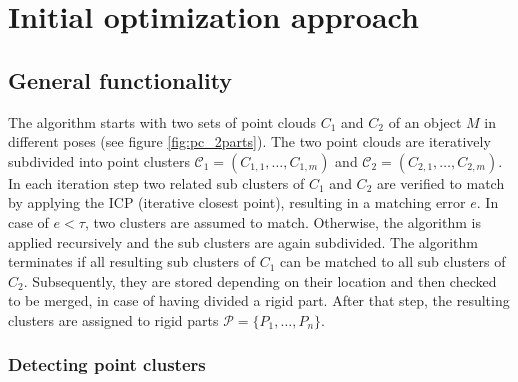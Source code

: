 \chapter{Initial optimization approach}
\label{cha:TheThesis}

\section{General functionality}

The algorithm starts with two sets of point clouds $C_1$ and $C_2$ of an object $M$ in different poses (see figure \ref{fig:pc_2parts}). The two point clouds are iteratively subdivided into point clusters $\mathcal{C}_1 =  (C_{1,1},\ldots, C_{1,m})$ and $\mathcal{C}_2 =  (C_{2,1},\ldots, C_{2,m})$. In each iteration step two related sub clusters of $C_1$ and $C_2$ are verified to match by applying the ICP (iterative closest point), resulting in a matching error $e$. In case of $e < \tau$, two clusters are assumed to match. Otherwise, the algorithm is applied recursively and the sub clusters are again subdivided. The algorithm terminates if all resulting sub clusters of $C_1$ can be matched to all sub clusters of $C_2$. Subsequently, they are stored depending on their location and then checked to be merged, in case of having divided a rigid part. After that step, the resulting clusters are assigned to rigid parts $\mathcal{P} =  \{P_1,\ldots,P_n\}$.

\subsection{Detecting point clusters}

